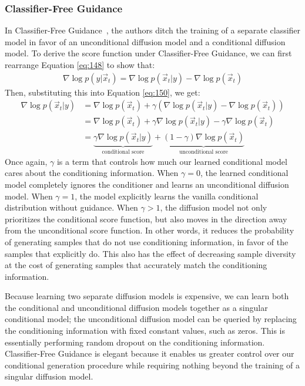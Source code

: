 \subsubsection*{Classifier-Free Guidance}
%
In Classifier-Free Guidance~\cite{ho2021classifier}, the authors ditch the training of a separate classifier model in favor of an unconditional diffusion model and a conditional diffusion model.  To derive the score function under Classifier-Free Guidance, we can first rearrange Equation \ref{eq:148} to show that:
\begin{align}
    \nabla\log p(y|\vec{x}_t) = \nabla\log p(\vec{x}_t|y) - \nabla\log p(\vec{x}_t)
\end{align}
Then, substituting this into Equation \ref{eq:150}, we get:
\begin{align}
\nabla\log p(\vec{x}_t|y)
&= \nabla\log p(\vec{x}_t) + \gamma\left(\nabla\log p(\vec{x}_t|y) - \nabla\log p(\vec{x}_t)\right)\\
&= \nabla\log p(\vec{x}_t) + \gamma\nabla\log p(\vec{x}_t|y) - \gamma\nabla\log p(\vec{x}_t)\\
&= \underbrace{\gamma\nabla\log p(\vec{x}_t|y)}_\text{conditional score} + \underbrace{(1 - \gamma)\nabla\log p(\vec{x}_t)}_\text{unconditional score}
\end{align}
Once again, $\gamma$ is a term that controls how much our learned conditional model cares about the conditioning information.  When $\gamma = 0$, the learned conditional model completely ignores the conditioner and learns an unconditional diffusion model.  When $\gamma = 1$, the model explicitly learns the vanilla conditional distribution without guidance.  When $\gamma > 1$, the diffusion model not only prioritizes the conditional score function, but also moves in the direction away from the unconditional score function.  In other words, it reduces the probability of generating samples that do not use conditioning information, in favor of the samples that explicitly do.  This also has the effect of decreasing sample diversity at the cost of generating samples that accurately match the conditioning information.

Because learning two separate diffusion models is expensive, we can learn both the conditional and unconditional diffusion models together as a singular conditional model; the unconditional diffusion model can be queried by replacing the conditioning information with fixed constant values, such as zeros.  This is essentially performing random dropout on the conditioning information.  Classifier-Free Guidance is elegant because it enables us greater control over our conditional generation procedure while requiring nothing beyond the training of a singular diffusion model.

